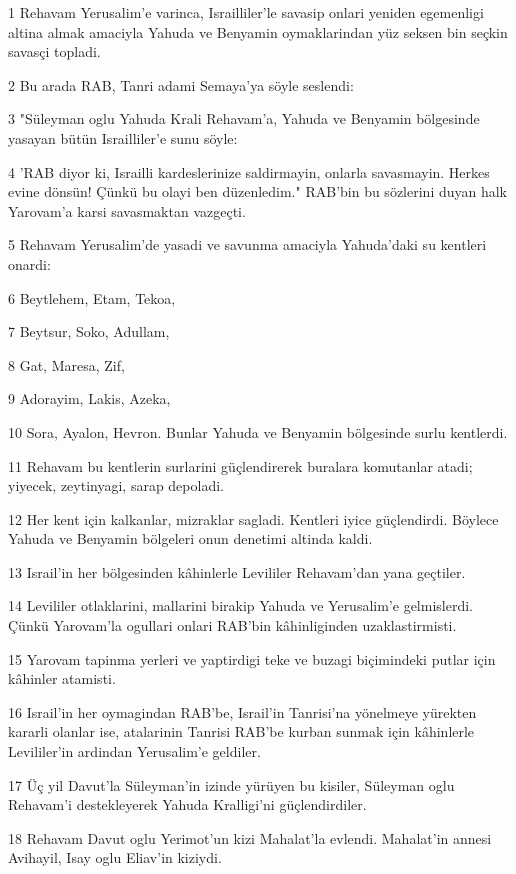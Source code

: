 \par 1 Rehavam Yerusalim'e varinca, Israilliler'le savasip onlari yeniden egemenligi altina almak amaciyla Yahuda ve Benyamin oymaklarindan yüz seksen bin seçkin savasçi topladi.
\par 2 Bu arada RAB, Tanri adami Semaya'ya söyle seslendi:
\par 3 "Süleyman oglu Yahuda Krali Rehavam'a, Yahuda ve Benyamin bölgesinde yasayan bütün Israilliler'e sunu söyle:
\par 4 'RAB diyor ki, Israilli kardeslerinize saldirmayin, onlarla savasmayin. Herkes evine dönsün! Çünkü bu olayi ben düzenledim." RAB'bin bu sözlerini duyan halk Yarovam'a karsi savasmaktan vazgeçti.
\par 5 Rehavam Yerusalim'de yasadi ve savunma amaciyla Yahuda'daki su kentleri onardi:
\par 6 Beytlehem, Etam, Tekoa,
\par 7 Beytsur, Soko, Adullam,
\par 8 Gat, Maresa, Zif,
\par 9 Adorayim, Lakis, Azeka,
\par 10 Sora, Ayalon, Hevron. Bunlar Yahuda ve Benyamin bölgesinde surlu kentlerdi.
\par 11 Rehavam bu kentlerin surlarini güçlendirerek buralara komutanlar atadi; yiyecek, zeytinyagi, sarap depoladi.
\par 12 Her kent için kalkanlar, mizraklar sagladi. Kentleri iyice güçlendirdi. Böylece Yahuda ve Benyamin bölgeleri onun denetimi altinda kaldi.
\par 13 Israil'in her bölgesinden kâhinlerle Levililer Rehavam'dan yana geçtiler.
\par 14 Levililer otlaklarini, mallarini birakip Yahuda ve Yerusalim'e gelmislerdi. Çünkü Yarovam'la ogullari onlari RAB'bin kâhinliginden uzaklastirmisti.
\par 15 Yarovam tapinma yerleri ve yaptirdigi teke ve buzagi biçimindeki putlar için kâhinler atamisti.
\par 16 Israil'in her oymagindan RAB'be, Israil'in Tanrisi'na yönelmeye yürekten kararli olanlar ise, atalarinin Tanrisi RAB'be kurban sunmak için kâhinlerle Levililer'in ardindan Yerusalim'e geldiler.
\par 17 Üç yil Davut'la Süleyman'in izinde yürüyen bu kisiler, Süleyman oglu Rehavam'i destekleyerek Yahuda Kralligi'ni güçlendirdiler.
\par 18 Rehavam Davut oglu Yerimot'un kizi Mahalat'la evlendi. Mahalat'in annesi Avihayil, Isay oglu Eliav'in kiziydi.
